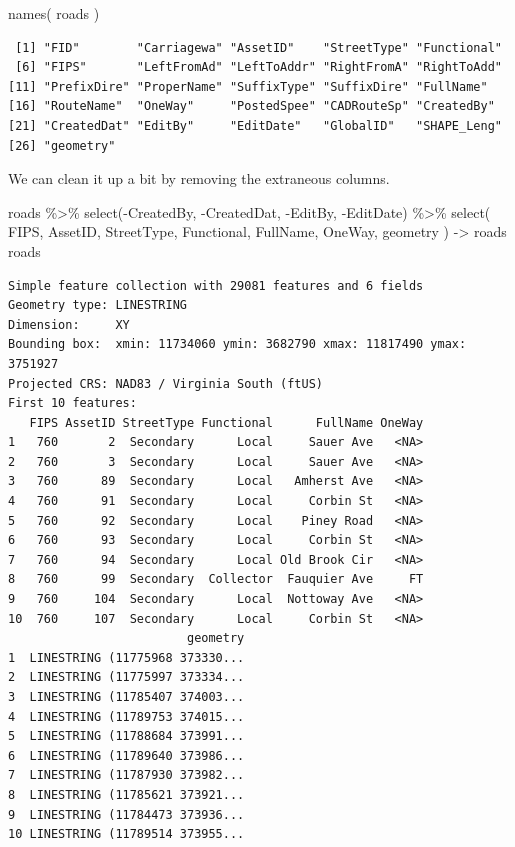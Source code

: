 \documentclass[
  letterpaper,
]{book}
\newenvironment{Shaded}{\begin{snugshade}}{\end{snugshade}}
\newcommand{\FunctionTok}[1]{\textcolor[rgb]{0.28,0.35,0.67}{#1}}
\newcommand{\NormalTok}[1]{\textcolor[rgb]{0.00,0.23,0.31}{#1}}
\newcommand{\OtherTok}[1]{\textcolor[rgb]{0.00,0.23,0.31}{#1}}
\newcommand{\SpecialCharTok}[1]{\textcolor[rgb]{0.37,0.37,0.37}{#1}}
\begin{document}
\begin{Shaded}
\begin{Highlighting}[]
\FunctionTok{names}\NormalTok{( roads )}
\end{Highlighting}
\end{Shaded}

\begin{verbatim}
 [1] "FID"        "Carriagewa" "AssetID"    "StreetType" "Functional"
 [6] "FIPS"       "LeftFromAd" "LeftToAddr" "RightFromA" "RightToAdd"
[11] "PrefixDire" "ProperName" "SuffixType" "SuffixDire" "FullName"  
[16] "RouteName"  "OneWay"     "PostedSpee" "CADRouteSp" "CreatedBy" 
[21] "CreatedDat" "EditBy"     "EditDate"   "GlobalID"   "SHAPE_Leng"
[26] "geometry"  
\end{verbatim}

We can clean it up a bit by removing the extraneous columns.

\begin{Shaded}
\begin{Highlighting}[]
\NormalTok{roads }\SpecialCharTok{\%\textgreater{}\%}
  \FunctionTok{select}\NormalTok{(}\SpecialCharTok{{-}}\NormalTok{CreatedBy,}
         \SpecialCharTok{{-}}\NormalTok{CreatedDat,}
         \SpecialCharTok{{-}}\NormalTok{EditBy,}
         \SpecialCharTok{{-}}\NormalTok{EditDate) }\SpecialCharTok{\%\textgreater{}\%}
  \FunctionTok{select}\NormalTok{( FIPS, AssetID, StreetType, Functional, FullName, OneWay, geometry ) }\OtherTok{{-}\textgreater{}}\NormalTok{ roads}
\NormalTok{roads}
\end{Highlighting}
\end{Shaded}

\begin{verbatim}
Simple feature collection with 29081 features and 6 fields
Geometry type: LINESTRING
Dimension:     XY
Bounding box:  xmin: 11734060 ymin: 3682790 xmax: 11817490 ymax: 3751927
Projected CRS: NAD83 / Virginia South (ftUS)
First 10 features:
   FIPS AssetID StreetType Functional      FullName OneWay
1   760       2  Secondary      Local     Sauer Ave   <NA>
2   760       3  Secondary      Local     Sauer Ave   <NA>
3   760      89  Secondary      Local   Amherst Ave   <NA>
4   760      91  Secondary      Local     Corbin St   <NA>
5   760      92  Secondary      Local    Piney Road   <NA>
6   760      93  Secondary      Local     Corbin St   <NA>
7   760      94  Secondary      Local Old Brook Cir   <NA>
8   760      99  Secondary  Collector  Fauquier Ave     FT
9   760     104  Secondary      Local  Nottoway Ave   <NA>
10  760     107  Secondary      Local     Corbin St   <NA>
                         geometry
1  LINESTRING (11775968 373330...
2  LINESTRING (11775997 373334...
3  LINESTRING (11785407 374003...
4  LINESTRING (11789753 374015...
5  LINESTRING (11788684 373991...
6  LINESTRING (11789640 373986...
7  LINESTRING (11787930 373982...
8  LINESTRING (11785621 373921...
9  LINESTRING (11784473 373936...
10 LINESTRING (11789514 373955...
\end{verbatim}
\end{document}
